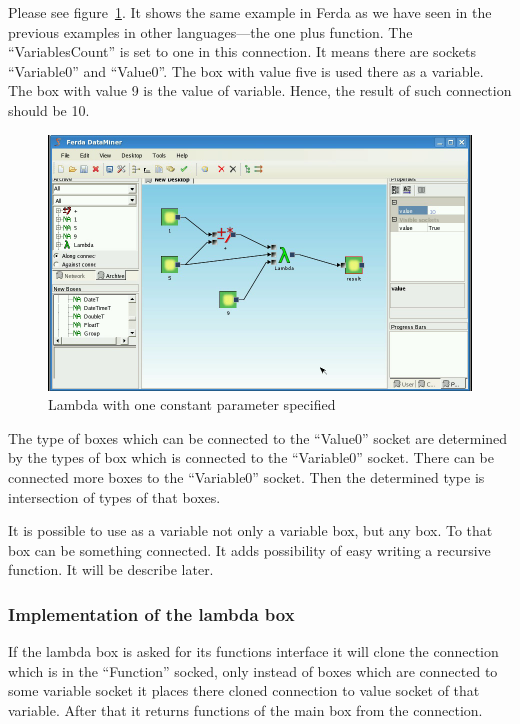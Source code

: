 \documentclass[a4paper,12pt]{book}
\begin{document}
Please see figure~\ref{fig:boxLambdaOnePlus}. It shows the same example in Ferda as we have seen in the previous examples in other languages---the one plus function. The ``VariablesCount'' is set to one in this connection. It means there are sockets ``Variable0'' and ``Value0''. The box with value five is used there as a variable. The box with value 9 is the value of variable. Hence, the result of such connection should be 10.
\begin{figure}
	\includegraphics[width=1\textwidth]{lambdaBasic3.png}
	\caption{Lambda with one constant parameter specified}
	\label{fig:boxLambdaOnePlus}
\end{figure}

The type of boxes which can be connected to the ``Value0'' socket are determined by the types of box which is connected to the ``Variable0'' socket. There can be connected more boxes to the ``Variable0'' socket. Then the determined type is intersection of types of that boxes.

It is possible to use as a variable not only a variable box, but any box. To that box can be something connected. It adds possibility of easy writing a recursive function. It will be describe later.   

\subsubsection{Implementation of the lambda box}
If the lambda box is asked for its functions interface it will clone the connection which is in the ``Function'' socked, only instead of boxes which are connected to some variable socket it places there cloned connection to value socket of that variable. After that it returns functions of the main box from the connection.
\end{document}
